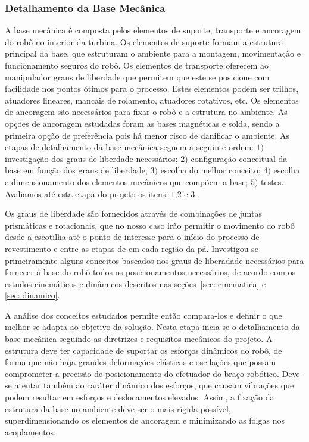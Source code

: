\subsubsection{Detalhamento da Base Mecânica}\label{sec::base_mec}
A base mecânica é composta pelos elementos de suporte, transporte e ancoragem do
robô no interior da turbina. Os elementos de suporte formam a estrutura
principal da base, que estruturam o ambiente para a montagem, movimentação e
funcionamento seguros do robô. Os elementos de transporte oferecem ao
manipulador graus de liberdade que permitem que este se posicione com facilidade
nos pontos ótimos para o processo. Estes elementos podem ser trilhos, atuadores
lineares, mancais de rolamento, atuadores rotativos, etc. Os elementos de
ancoragem são necessários para fixar o robô e a estrutura no ambiente. As
opções de ancoragem estudadas foram as bases magnéticas e solda, sendo a
primeira opção de preferência pois há menor risco de danificar o ambiente. As
etapas de detalhamento da base mecânica seguem a seguinte ordem: $1)$ investigação dos
graus de liberdade necessários; $2)$ configuração conceitual da base em função
dos graus de liberdade; $3)$ escolha do melhor conceito; $4)$ escolha e
dimensionamento dos elementos mecânicos que compõem a base; $5)$ testes.
Avaliamos até esta etapa do projeto os itens: $1$,$2$ e $3$.

Os graus de liberdade são fornecidos através de combinações de juntas
prismáticas e rotacionais, que no nosso caso irão permitir o movimento do robô
desde a escotilha até o ponto de interesse para o início do processo de
revestimento e entre as etapas de em cada região da pá.
Investigou-se primeiramente alguns conceitos baseados nos graus de liberadade 
necessários para fornecer à base do robô todos os posicionamentos necessários, 
de acordo com os estudos cinemáticos e dinâmicos descritos  nas
seções~\ref{sec::cinematica} e \ref{sec::dinamico}.

A análise dos conceitos estudados permite então compara-los e definir o que
melhor se adapta ao objetivo da solução. Nesta etapa incia-se o detalhamento da base
mecânica seguindo as diretrizes e requisitos mecânicos do projeto. A
estrutura deve ter capacidade de suportar os esforços dinâmicos do robô,
de forma que não haja grandes deformações elásticas e oscilações que possam
comprometer a precisão de posicionamento do efetuador do braço robótico.
Deve-se atentar também ao caráter dinâmico dos esforços, que causam vibrações
que podem resultar em esforços e deslocamentos elevados.
Assim, a fixação da estrutura da base no ambiente deve ser o mais rígida
possível, superdimensionando os elementos de ancoragem e minimizando as folgas
nos acoplamentos.


